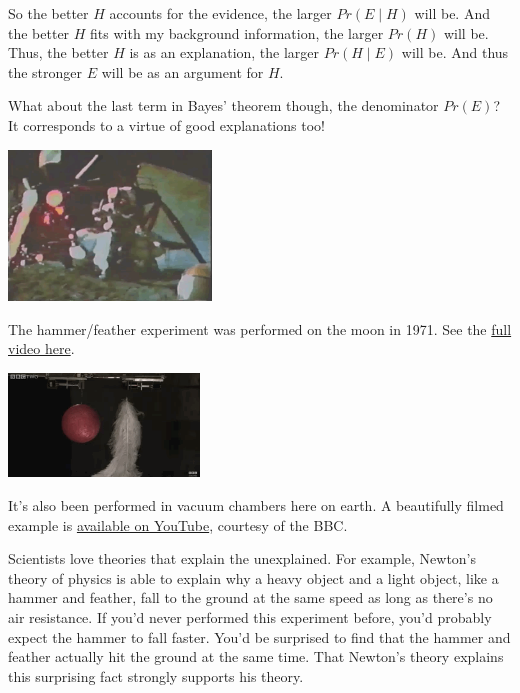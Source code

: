 \documentclass[justified]{tufte-book}
\newcommand{\given}{\mid}
\newcommand{\p}{Pr}
\theoremstyle{definition}
\theoremstyle{definition}
\theoremstyle{definition}
\theoremstyle{remark}
\begin{document}
So the better \(H\) accounts for the evidence, the larger
\(\p(E \given H)\) will be. And the better \(H\) fits with my background
information, the larger \(\p(H)\) will be. Thus, the better \(H\) is as
an explanation, the larger \(\p(H \given E)\) will be. And thus the
stronger \(E\) will be as an argument for \(H\).

What about the last term in Bayes' theorem though, the denominator
\(\p(E)\)? It corresponds to a virtue of good explanations too!









\begin{marginfigure}
\includegraphics[width=2.12in]{img/moon} \caption[The hammer/feather experiment was performed on the moon
in 1971. See the \href{https://bit.ly/1KLQzOB}{full video here}.]{The hammer/feather experiment was performed on the moon
in 1971. See the \href{https://bit.ly/1KLQzOB}{full video here}.}\label{fig:unnamed-chunk-90}
\end{marginfigure}
\begin{marginfigure}
\includegraphics[width=2in]{img/vacuum} \caption[It's also been performed in vacuum chambers here on
earth. A beautifully filmed example is
\href{https://bit.ly/10hw8mP}{available on YouTube}, courtesy of the
BBC.]{It's also been performed in vacuum chambers here on
earth. A beautifully filmed example is
\href{https://bit.ly/10hw8mP}{available on YouTube}, courtesy of the
BBC.}\label{fig:unnamed-chunk-90}
\end{marginfigure}

Scientists love theories that explain the unexplained. For example,
Newton's theory of physics is able to explain why a heavy object and a
light object, like a hammer and feather, fall to the ground at the same
speed as long as there's no air resistance. If you'd never performed
this experiment before, you'd probably expect the hammer to fall faster.
You'd be surprised to find that the hammer and feather actually hit the
ground at the same time. That Newton's theory explains this surprising
fact strongly supports his theory.
\end{document}
